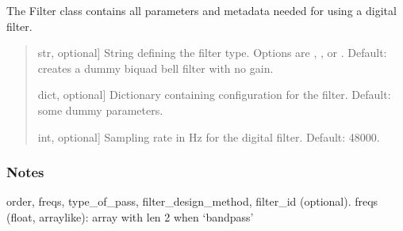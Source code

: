 \documentclass[letterpaper,10pt,english]{sphinxmanual}
\begin{document}
\begin{fulllineitems}
\begin{fulllineitems}
\label{\detokenize{classes:dsptools.classes.filter_class.Filter.__init__}}
\pysigstartsignatures
{}
\pysigstopsignatures
\sphinxAtStartPar
The Filter class contains all parameters and metadata needed for
using a digital filter.
\begin{quote}\begin{description}
\begin{description}
\sphinxlineitem{\sphinxstylestrong{filter\_type}}{[}str, optional{]}
\sphinxAtStartPar
String defining the filter type. Options are , ,
 or . Default: creates a dummy biquad bell filter
with no gain.

\sphinxlineitem{\sphinxstylestrong{filter\_configuration}}{[}dict, optional{]}
\sphinxAtStartPar
Dictionary containing configuration for the filter.
Default: some dummy parameters.

\sphinxlineitem{\sphinxstylestrong{sampling\_rate\_hz}}{[}int, optional{]}
\sphinxAtStartPar
Sampling rate in Hz for the digital filter. Default: 48000.

\end{description}

\end{description}\end{quote}
\subsubsection*{Notes}
\begin{description}
\sphinxAtStartPar
order, freqs, type\_of\_pass, filter\_design\_method,
filter\_id (optional).
freqs (float, array\sphinxhyphen{}like): array with len 2 when ‘bandpass’
\begin{quote}


\end{quote}
\end{description}
\end{fulllineitems}
\end{fulllineitems}
\end{document}

